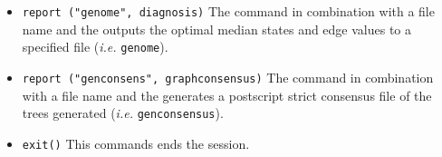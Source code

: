 \begin{itemize}
\item \texttt{report ("genome", diagnosis)}  The  command in combination with a file name and the  outputs the optimal median states and edge values to a specified file (\emph{i.e.} \texttt{genome}). 
\item \texttt{report ("genconsens", graphconsensus)}  The  command in combination with a file name and the  generates a postscript strict consensus file of the trees generated (\emph{i.e.} \texttt{genconsensus}). 
\item \texttt{exit()} This commands ends the \poy session.
\end{itemize}





